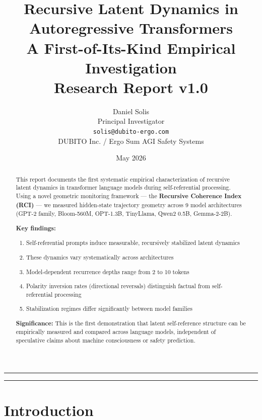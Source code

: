 \documentclass[12pt,a4paper]{article}
\title{\textbf{Recursive Latent Dynamics in Autoregressive Transformers}\\
\large A First-of-Its-Kind Empirical Investigation\\
\vspace{0.5cm}
\large Research Report v1.0}
\author{Daniel Solis\\
\small Principal Investigator\\
\small \texttt{solis@dubito-ergo.com}\\
\vspace{0.3cm}
\small DUBITO Inc. / Ergo Sum AGI Safety Systems}
\date{May 2026}
\begin{document}
\maketitle

\begin{center}
\rule{0.8\textwidth}{0.4pt}
\end{center}

\begin{abstract}
\noindent
This report documents the first systematic empirical characterization of recursive latent dynamics in transformer language models during self-referential processing. Using a novel geometric monitoring framework — the \textbf{Recursive Coherence Index (RCI)} — we measured hidden-state trajectory geometry across 9 model architectures (GPT-2 family, Bloom-560M, OPT-1.3B, TinyLlama, Qwen2 0.5B, Gemma-2-2B).

\vspace{0.3cm}
\noindent
\textbf{Key findings:}
\begin{enumerate}[noitemsep]
    \item Self-referential prompts induce measurable, recursively stabilized latent dynamics
    \item These dynamics vary systematically across architectures
    \item Model-dependent recurrence depths range from 2 to 10 tokens
    \item Polarity inversion rates (directional reversals) distinguish factual from self-referential processing
    \item Stabilization regimes differ significantly between model families
\end{enumerate}

\vspace{0.3cm}
\noindent
\textbf{Significance:} This is the first demonstration that latent self-reference structure can be empirically measured and compared across language models, independent of speculative claims about machine consciousness or safety prediction.
\end{abstract}

\begin{center}
\rule{0.8\textwidth}{0.4pt}
\end{center}

\tableofcontents
\newpage

\section{Introduction}
\end{document}
